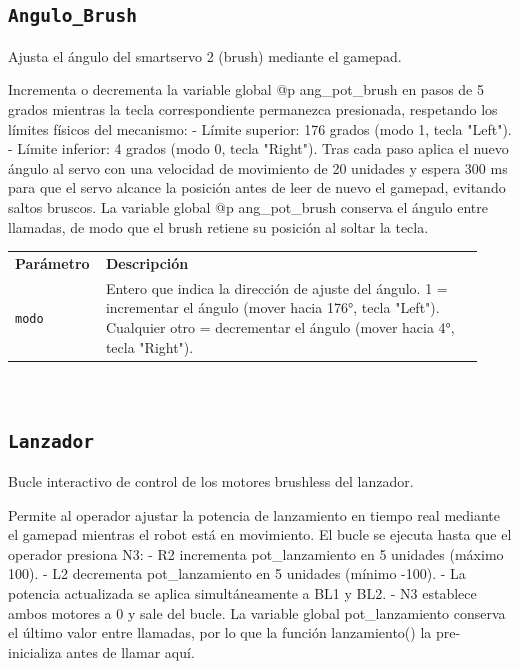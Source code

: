 \subsection{\texttt{Angulo\_Brush}}
\label{fn:AnguloBrush}
Ajusta el ángulo del smartservo 2 (brush) mediante el gamepad.

Incrementa o decrementa la variable global @p ang\_pot\_brush en pasos de 5 grados mientras la tecla correspondiente permanezca presionada, respetando los límites físicos del mecanismo: - Límite superior: 176 grados (modo 1, tecla "Left"). - Límite inferior: 4 grados   (modo 0, tecla "Right"). Tras cada paso aplica el nuevo ángulo al servo con una velocidad de movimiento de 20 unidades y espera 300 ms para que el servo alcance la posición antes de leer de nuevo el gamepad, evitando saltos bruscos. La variable global @p ang\_pot\_brush conserva el ángulo entre llamadas, de modo que el brush retiene su posición al soltar la tecla.

\begin{tabular}{@{}p{0.15\linewidth}p{0.78\linewidth}@{}}
\textbf{Par\'ametro} & \textbf{Descripci\'on} \\
\texttt{modo} & Entero que indica la dirección de ajuste del ángulo. 1              = incrementar el ángulo (mover hacia 176°, tecla "Left"). Cualquier otro = decrementar el ángulo (mover hacia 4°, tecla "Right"). \\
\end{tabular}\\[4pt]

\subsection{\texttt{Lanzador}}
\label{fn:Lanzador}
Bucle interactivo de control de los motores brushless del lanzador.

Permite al operador ajustar la potencia de lanzamiento en tiempo real mediante el gamepad mientras el robot está en movimiento. El bucle se ejecuta hasta que el operador presiona N3: - R2 incrementa pot\_lanzamiento en 5 unidades (máximo 100). - L2 decrementa pot\_lanzamiento en 5 unidades (mínimo -100). - La potencia actualizada se aplica simultáneamente a BL1 y BL2. - N3 establece ambos motores a 0 y sale del bucle. La variable global pot\_lanzamiento conserva el último valor entre llamadas, por lo que la función lanzamiento() la pre-inicializa antes de llamar aquí.


